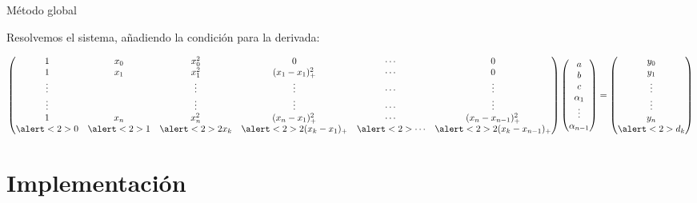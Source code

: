 \documentclass[compress]{beamer}
\theoremstyle{definition}
\theoremstyle{remark}
\begin{document}
\begin{frame}{Método global}

Resolvemos el sistema, añadiendo la condición para la derivada:

\begin{equation*}
\begin{pmatrix}
  1 & x_0 & x_0^2   & 0 & \cdots & 0\\
  1 & x_1 & x_1^2   & (x_1-x_1)_{+}^2 & \cdots & 0\\
  \vdots& & \vdots  & \vdots          & \cdots & \vdots \\
  \vdots& & \vdots  & \vdots          & \cdots & \vdots \\
  1 & x_n & x_n^2   & (x_n-x_1)_{+}^2 & \cdots & (x_n-x_{n-1})_{+}^2\\
  \alert<2>{0} &   \alert<2>{1} &  \alert<2>{2x_k} & \alert<2>{2(x_k-x_1)_{+}} & \alert<2>{\cdots} & \alert<2>{2(x_k-x_{n-1})_{+}}
\end{pmatrix}
\begin{pmatrix}
  a \\
  b \\
  c \\
  \alpha_1 \\
  \vdots \\
  \alpha_{n-1}
\end{pmatrix}
=
\begin{pmatrix}
  y_0\\
  y_1\\
  \vdots\\
  \vdots\\
  y_n\\
  \alert<2>{d_k}\\
\end{pmatrix}
\end{equation*}

\vspace{2pt}

\end{frame}

\section{Implementación}
\end{document}
